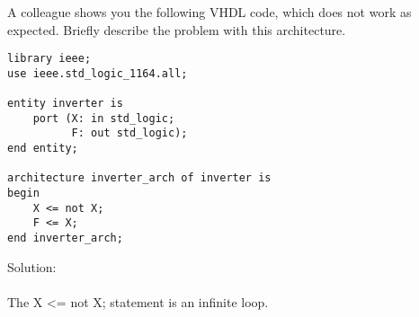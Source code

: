A colleague shows you the following VHDL code, which does not work as expected.  Briefly describe the problem with this architecture.
\lstset{language=VHDL}
\begin{lstlisting}
library ieee;
use ieee.std_logic_1164.all;

entity inverter is
    port (X: in std_logic;
          F: out std_logic);
end entity;

architecture inverter_arch of inverter is
begin
    X <= not X;
    F <= X;
end inverter_arch;
\end{lstlisting}

Solution: \\ \\
The X <= not X; statement is an infinite loop. \\ \\
